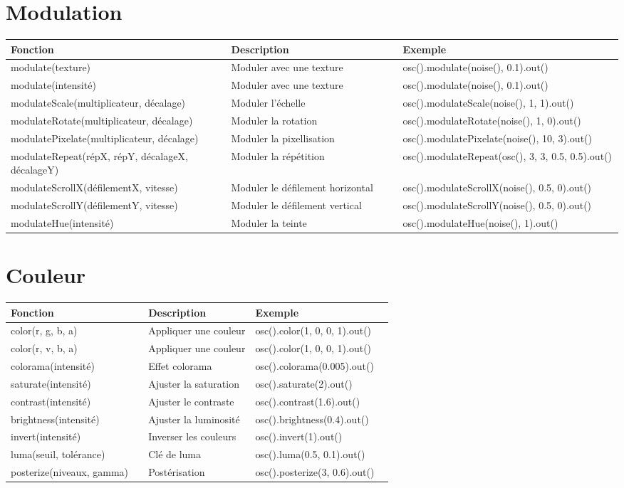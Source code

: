 \documentclass[9pt,oneside]{amsart}
\begin{document}
\section*{Modulation}
\begin{tabular}{L{0.36\linewidth}L{0.28\linewidth}L{0.40\linewidth}}
\toprule
\textbf{Fonction} & \textbf{Description} & \textbf{Exemple} \\
\midrule
modulate(texture) & Moduler avec une texture & osc().modulate(noise(), 0.1).out() \\
modulate(intensité) & Moduler avec une texture & osc().modulate(noise(), 0.1).out() \\
modulateScale(multiplicateur, décalage) & Moduler l'échelle & osc().modulateScale(noise(), 1, 1).out() \\
modulateRotate(multiplicateur, décalage) & Moduler la rotation & osc().modulateRotate(noise(), 1, 0).out() \\
modulatePixelate(multiplicateur, décalage) & Moduler la pixellisation & osc().modulatePixelate(noise(), 10, 3).out() \\
modulateRepeat(répX, répY, décalageX, décalageY) & Moduler la répétition & osc().modulateRepeat(osc(), 3, 3, 0.5, 0.5).out() \\
modulateScrollX(défilementX, vitesse) & Moduler le défilement horizontal & osc().modulateScrollX(noise(), 0.5, 0).out() \\
modulateScrollY(défilementY, vitesse) & Moduler le défilement vertical & osc().modulateScrollY(noise(), 0.5, 0).out() \\
modulateHue(intensité) & Moduler la teinte & osc().modulateHue(noise(), 1).out() \\
\bottomrule
\end{tabular}

\section*{Couleur}
\begin{tabular}{L{0.36\linewidth}L{0.28\linewidth}L{0.40\linewidth}}
\toprule
\textbf{Fonction} & \textbf{Description} & \textbf{Exemple} \\
\midrule
color(r, g, b, a) & Appliquer une couleur & osc().color(1, 0, 0, 1).out() \\
color(r, v, b, a) & Appliquer une couleur & osc().color(1, 0, 0, 1).out() \\
colorama(intensité) & Effet colorama & osc().colorama(0.005).out() \\
saturate(intensité) & Ajuster la saturation & osc().saturate(2).out() \\
contrast(intensité) & Ajuster le contraste & osc().contrast(1.6).out() \\
brightness(intensité) & Ajuster la luminosité & osc().brightness(0.4).out() \\
invert(intensité) & Inverser les couleurs & osc().invert(1).out() \\
luma(seuil, tolérance) & Clé de luma & osc().luma(0.5, 0.1).out() \\
posterize(niveaux, gamma) & Postérisation & osc().posterize(3, 0.6).out() \\
\bottomrule
\end{tabular}
\end{document}
